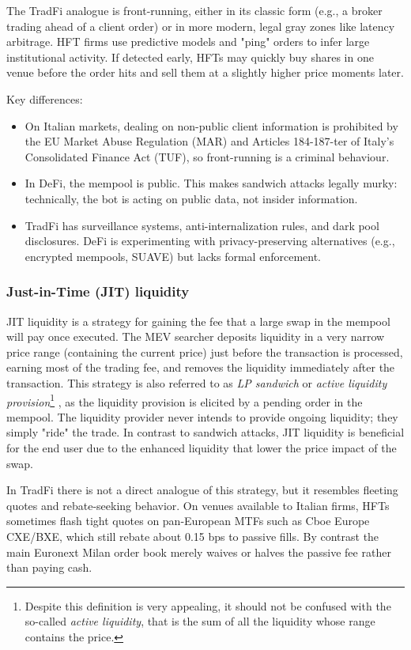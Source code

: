 \documentclass[a4paper,11pt]{article}
\begin{document}
The TradFi analogue is front-running, either in its classic form (e.g., a broker trading ahead of a client order) or in more modern, legal gray zones like latency arbitrage. HFT firms use predictive models and "ping" orders to infer large institutional activity. If detected early, HFTs may quickly buy shares in one venue before the order hits and sell them at a slightly higher price moments later.

Key differences:
\begin{itemize}
    \item On Italian markets, dealing on non-public client information is prohibited by the EU Market Abuse Regulation (MAR) and Articles 184-187-ter of Italy’s Consolidated Finance Act (TUF), so front-running is a criminal behaviour.
    \item In DeFi, the mempool is public. This makes sandwich attacks legally murky: technically, the bot is acting on public data, not insider information.
    \item TradFi has surveillance systems, anti-internalization rules, and dark pool disclosures. DeFi is experimenting with privacy-preserving alternatives (e.g., encrypted mempools, SUAVE) but lacks formal enforcement.
\end{itemize}

\subsubsection{Just-in-Time (JIT) liquidity}
JIT liquidity is a strategy for gaining the fee that a large swap in the mempool will pay once executed. The MEV searcher deposits liquidity in a very narrow price range (containing the current price) just before the transaction is processed, earning most of the trading fee, and removes the liquidity immediately after the transaction. This strategy is also referred to as \textit{LP sandwich} or \textit{active liquidity provision}\footnote{Despite this definition is very appealing, it should not be confused with the so-called \textit{active liquidity}, that is the sum of all the liquidity whose range contains the price.} \cite{capponi2023paradox}, as the liquidity provision is elicited by a pending order in the mempool. The liquidity provider never intends to provide ongoing liquidity; they simply "ride" the trade. In contrast to sandwich attacks, JIT liquidity is beneficial for the end user due to the enhanced liquidity that lower the price impact of the swap.

In TradFi there is not a direct analogue of this strategy, but it resembles fleeting quotes and rebate-seeking behavior. On venues available to Italian firms, HFTs sometimes flash tight quotes on pan-European MTFs such as Cboe Europe CXE/BXE, which still rebate about 0.15 bps to passive fills. By contrast the main Euronext Milan order book merely waives or halves the passive fee rather than paying cash.
\end{document}
